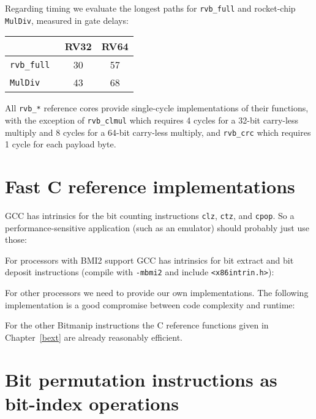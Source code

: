 Regarding timing we evaluate the longest paths for {\tt rvb\_full} and
rocket-chip {\tt MulDiv}, measured in gate delays:

\begin{center}
\begin{tabular}{lcc}
& RV32 & RV64 \\
\hline
\tt rvb\_full & 30 & 57 \\
\tt MulDiv & 43 & 68 \\
\end{tabular}
\end{center}

All {\tt rvb\_*} reference cores provide single-cycle implementations of their functions,
with the exception of {\tt rvb\_clmul} which requires 4 cycles for a 32-bit
carry-less multiply and 8 cycles for a 64-bit carry-less multiply, and {\tt rvb\_crc}
which requires 1 cycle for each payload byte.


\section{Fast C reference implementations}
\label{fastc}

GCC has intrinsics for the bit counting instructions {\tt clz}, {\tt ctz}, and
{\tt cpop}.  So a performance-sensitive application (such as an emulator)
should probably just use those:



For processors with BMI2 support GCC has intrinsics for bit extract and bit
deposit instructions (compile with {\tt -mbmi2} and include {\tt <x86intrin.h>}):



For other processors we need to provide our own implementations. The following
implementation is a good compromise between code complexity and runtime:



For the other Bitmanip instructions the C reference functions given in Chapter~\ref{bext}
are already reasonably efficient.


\section{Bit permutation instructions as bit-index operations}

